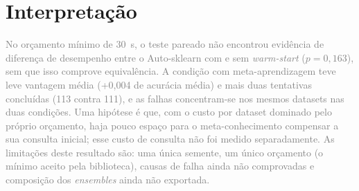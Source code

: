 \documentclass[10pt]{article}
\newcommand{\pend}[1]{}
\newcommand{\editinst}[1]{\textcolor{gray}{#1}}
\begin{document}
\pend{\subsection{O que o AutoML escolheu} [Algoritmos, \textit{ensemble} e pré-processamento do modelo final de cada dataset; se há MLP entre eles; concordância com a recomendação da meta-aprendizagem; relação dos maiores ganhos do AutoML com as meta-características, a distância ao vizinho mais próximo (Atividade 3) e a perda do meta-modelo. O ganho vem de escolher melhor entre as mesmas MLPs ou de buscar num espaço maior?]}

\section{Interpretação}\label{sec:interp}
\editinst{No orçamento mínimo de 30~s, o teste pareado não encontrou evidência de diferença de desempenho entre o Auto-sklearn com e sem \textit{warm-start} ($p = 0{,}163$), sem que isso comprove equivalência. A condição com meta-aprendizagem teve leve vantagem média (+0{,}004 de acurácia média) e mais duas tentativas concluídas (113 contra 111), e as falhas concentram-se nos mesmos datasets nas duas condições. Uma hipótese é que, com o custo por dataset dominado pelo próprio orçamento, haja pouco espaço para o meta-conhecimento compensar a sua consulta inicial; esse custo de consulta não foi medido separadamente. As limitações deste resultado são: uma única semente, um único orçamento (o mínimo aceito pela biblioteca), causas de falha ainda não comprovadas e composição dos \textit{ensembles} ainda não exportada.}
\pend{[Interpretação final com os braços de MtL corrigidos e a análise de composição dos ensembles.]}



\end{document}
